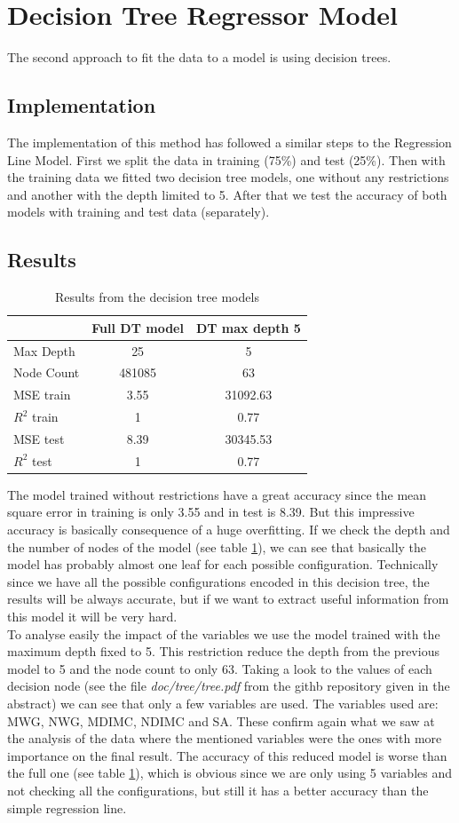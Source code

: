 \documentclass[sigconf,authorversion]{acmart}
\begin{document}
\section{Decision Tree Regressor Model}
The second approach to fit the data to a model is using decision trees.
\subsection{Implementation}
The implementation of this method has followed a similar steps to the Regression Line Model. First we split the data in training (75\%) and test (25\%). Then with the training data we fitted two decision tree models, one without any restrictions and another with the depth limited to 5. After that we test the accuracy of both models with training and test data (separately).
\subsection{Results}
\begin{table}[htbp]
\begin{tabular}{lcc}
  \toprule
  & Full DT model & DT max depth 5 \\
  \midrule
  Max Depth & 25 & 5 \\
  Node Count & 481085 & 63 \\
  MSE train & 3.55 & 31092.63 \\
  $R^2$ train & 1 & 0.77 \\
  MSE test & 8.39 & 30345.53 \\
  $R^2$ test & 1 & 0.77 \\
  \bottomrule
\end{tabular}
\caption{Results from the decision tree models}
\label{tab:dt}
\end{table}
The model trained without restrictions have a great accuracy since the mean square error in training is only 3.55 and in test is 8.39. But this impressive accuracy is basically consequence of a huge overfitting. If we check the depth and the number of nodes of the model (see table \ref{tab:dt}), we can see that basically the model has probably almost one leaf for each possible configuration. Technically since we have all the possible configurations encoded in this decision tree, the results will be always accurate, but if we want to extract useful information from this model it will be very hard.\\
To analyse easily the impact of the variables we use the model trained with the maximum depth fixed to 5. This restriction reduce the depth from the previous model to 5 and the node count to only 63. Taking a look to the values of each decision node (see the file \textit{doc/tree/tree.pdf} from the githb repository given in the abstract) we can see that only a few variables are used. The variables used are: MWG, NWG, MDIMC, NDIMC and SA. These confirm again what we saw at the analysis of the data where the mentioned variables were the ones with more importance on the final result. The accuracy of this reduced model is worse than the full one (see table \ref{tab:dt}), which is obvious since we are only using 5 variables and not checking all the configurations, but still it has a better accuracy than the simple regression line.
\end{document}
